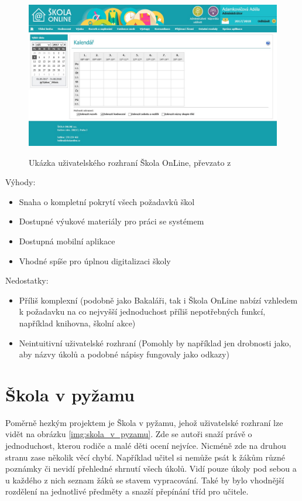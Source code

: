 \begin{figure}[H]
    \caption{Ukázka uživatelského rozhraní Škola OnLine, převzato z \cite{skolaonline}}
    \centering
    \includegraphics[width=\textwidth]{images/skola_online}
    \label{img:skolaonline}
\end{figure}
\newpage
Výhody:
\begin{itemize}
  \item Snaha o kompletní pokrytí všech požadavků škol
  \item Dostupné výukové materiály pro práci se systémem
  \item Dostupná mobilní aplikace
  \item Vhodné spíše pro úplnou digitalizaci školy
\end{itemize}

Nedostatky:
\begin{itemize}
  \item Příliš komplexní (podobně jako Bakaláři, tak i Škola OnLine nabízí vzhledem k požadavku na co nejvyšší jednoduchost příliš nepotřebných funkcí, například knihovna, školní akce)
  \item Neintuitivní uživatelské rozhraní (Pomohly by například jen drobnosti jako, aby názvy úkolů a podobné nápisy fungovaly jako odkazy)
\end{itemize}


\section{Škola v pyžamu}

Poměrně hezkým projektem je Škola v pyžamu, jehož uživatelské rozhraní lze vidět na obrázku \ref{img:skola_v_pyzamu}. Zde se autoři snaží právě o jednoduchost, kterou rodiče a malé děti ocení nejvíce. Nicméně zde na druhou stranu zase několik věcí chybí. Například učitel si nemůže psát k žákům různé poznámky či nevidí přehledné shrnutí všech úkolů. Vidí pouze úkoly pod sebou a u každého z nich seznam žáků se stavem vypracování. Také by bylo vhodnější rozdělení na jednotlivé předměty a snazší přepínání tříd pro učitele.

